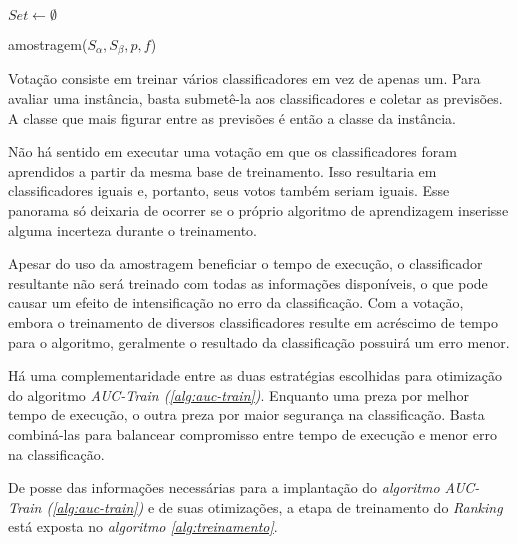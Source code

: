 \begin{function}[h]

    $Set \gets \emptyset$\;
    


    \caption{amostragem($S_{\alpha}, S_{\beta}, p, f$)}
    \label{func:amostragem}
\end{function}

Votação consiste em treinar vários classificadores em vez de apenas um. Para avaliar uma instância, basta submetê-la aos classificadores e coletar as previsões. A classe que mais figurar entre as previsões é então a classe da instância.

Não há sentido em executar uma votação em que os classificadores foram aprendidos a partir da mesma base de treinamento. Isso resultaria em classificadores iguais e, portanto, seus votos também seriam iguais. Esse panorama só deixaria de ocorrer se o próprio algoritmo de aprendizagem inserisse alguma incerteza durante o treinamento.

Apesar do uso da amostragem beneficiar o tempo de execução, o classificador resultante não será treinado com todas as informações disponíveis, o que pode causar um efeito de intensificação no erro da classificação. Com a votação, embora o treinamento de diversos classificadores resulte em acréscimo de tempo para o algoritmo, geralmente o resultado da classificação possuirá um erro menor.

Há uma complementaridade entre as duas estratégias escolhidas para otimização do algoritmo \emph{AUC-Train (\ref{alg:auc-train})}. Enquanto uma preza por melhor tempo de execução, o outra preza por maior segurança na classificação. Basta combiná-las para balancear compromisso entre tempo de execução e menor erro na classificação.

De posse das informações necessárias para a implantação do \emph{algoritmo AUC-Train (\ref{alg:auc-train})} e de suas otimizações, a etapa de treinamento do \emph{Ranking} está exposta no \emph{algoritmo \ref{alg:treinamento}}.

